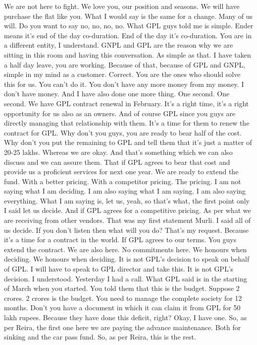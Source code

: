 We are not here to fight.
We love you, our position and seasons.
We will have purchase the flat like you.
What I would say is the same for a change.
Many of us will.
Do you want to say no, no, no, no.
What GPL guys told me is simple.
Ender means it's end of the day co-duration. End of the day it's co-duration.
You are in a different entity, I understand.
GNPL and GPL are the reason why we are sitting in this room and having this conversation.
As simple as that. I have taken a half day leave, you are working.
Because of that, because of GPL and GNPL, simple in my mind as a customer.
Correct.
You are the ones who should solve this for us.
You can't do it.
You don't have any more money from my money.
I don't have money.
And I have also done one more thing.
One second.
One second.
We have GPL contract renewal in February.
It's a right time, it's a right opportunity for us also as an owners.
And of course GPL since you guys are directly managing that relationship with them.
It's a time for them to renew the contract for GPL.
Why don't you guys, you are ready to bear half of the cost.
Why don't you put the remaining to GPL and tell them that it's just a matter of 20-25 lakhs.
Whereas we are okay.
And that's something which we can also discuss and we can assure them.
That if GPL agrees to bear that cost and provide us a proficient services for next one year.
We are ready to extend the fund.
With a better pricing.
With a competitor pricing.
The pricing.
I am not saying what I am deciding.
I am also saying what I am saying.
I am also saying everything.
What I am saying is, let us, yeah, so that's what, the first point only I said let us decide.
And if GPL agrees for a competitive pricing.
As per what we are receiving from other vendors.
That was my first statement Murli.
I said all of us decide.
If you don't listen then what will you do?
That's my request.
Because it's a time for a contract in the world.
If GPL agrees to our terms.
You guys extend the contract.
We are also here.
No commitments here.
We honours when deciding.
We honours when deciding.
It is not GPL's decision to speak on behalf of GPL.
I will have to speak to GPL director and take this.
It is not GPL's decision.
I understood.
Yesterday I had a call.
What GPL said is in the starting of March when you started.
You told them that this is the budget.
Suppose 2 crores.
2 crores is the budget.
You need to manage the complete society for 12 months.
Don't you have a document in which it can claim it from GPL for 50 lakh rupees.
Because they have done this deficit, right?
Okay, I have one.
So, as per Reira, the first one here we are paying the advance maintenance.
Both for sinking and the car pass fund.
So, as per Reira, this is the rest.
